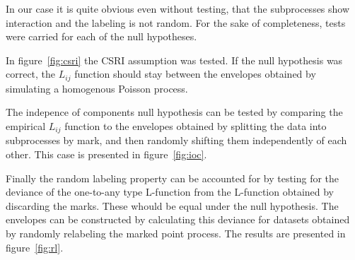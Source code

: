 \documentclass[12pt,a4paper,oneside,article]{memoir}
\begin{document}
In our case it is quite obvious even without testing, that the
subprocesses show interaction and the labeling is not random. For the sake
of completeness, tests were carried for each of the null hypotheses.

In figure~\ref{fig:csri} the CSRI assumption was tested. If the null hypothesis
was correct, the $L_{ij}$ function should stay between the envelopes obtained
by simulating a homogenous Poisson process.

The indepence of components null hypothesis can be tested by comparing the empirical
$L_{ij}$ function to the envelopes obtained by splitting the data into subprocesses by mark,
and then randomly shifting them independently of each other. This case is presented
in figure~\ref{fig:ioc}.

Finally the random labeling property can be accounted for by testing for the deviance
of the one-to-any type L-function from the L-function obtained by discarding the marks.
These whould be equal under the null hypothesis. The envelopes can be constructed
by calculating this deviance for datasets obtained by randomly relabeling
the marked point process. The results are presented in figure~\ref{fig:rl}.
\end{document}
